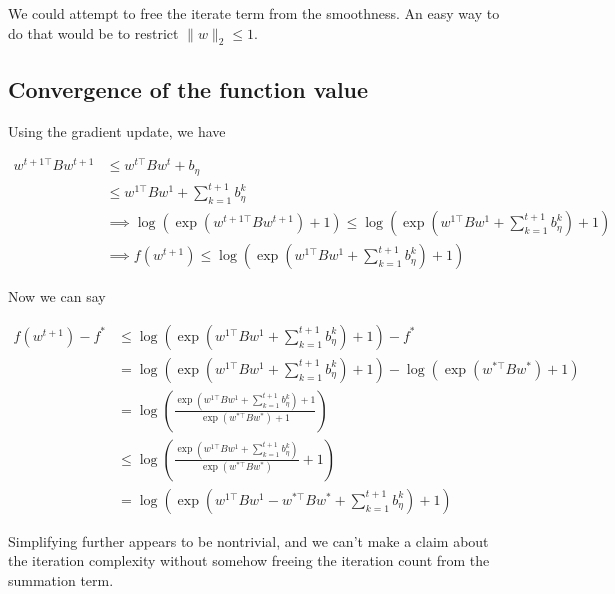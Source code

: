 \documentclass[11pt]{article}
\begin{document}
We could attempt to free the iterate term from the smoothness. An easy way to do that would be to restrict $\|w\|_2 \leq 1$.

\subsection{Convergence of the function value}

Using the gradient update, we have

\begin{align*}
    w^{t+1\top}Bw^{t+1} &\leq w^{t\top}Bw^{t} + b_\eta \\
    &\leq w^{1\top}Bw^{1} + \sum_{k=1}^{t+1} b_\eta^k \\
    &\implies \log( \exp(w^{t+1\top}Bw^{t+1}) + 1) \leq \log( \exp(w^{1\top}Bw^{1} + \sum_{k=1}^{t+1} b_\eta^k) + 1) \\
    &\implies f(w^{t+1}) \leq \log( \exp(w^{1\top}Bw^{1} + \sum_{k=1}^{t+1} b_\eta^k) + 1)
\end{align*}

Now we can say

\begin{align*}
    f(w^{t+1}) - f^* &\leq \log( \exp(w^{1\top}Bw^{1} + \sum_{k=1}^{t+1} b_\eta^k) + 1) - f^* \\
    &= \log( \exp(w^{1\top}Bw^{1} + \sum_{k=1}^{t+1} b_\eta^k) + 1) - \log( \exp(w^{*\top}Bw^{*}) + 1) \\
    &= \log \left( \frac{\exp(w^{1\top}Bw^{1} + \sum_{k=1}^{t+1} b_\eta^k) + 1}{\exp(w^{*\top}Bw^{*}) + 1} \right) \\
    &\leq \log \left( \frac{\exp(w^{1\top}Bw^{1} + \sum_{k=1}^{t+1} b_\eta^k)}{\exp(w^{*\top}Bw^{*})} + 1 \right) \\
    &= \log \left( \exp \left(w^{1\top}Bw^{1} - w^{*\top}Bw^{*} + \sum_{k=1}^{t+1} b_\eta^k \right) + 1 \right)
\end{align*}

Simplifying further appears to be nontrivial, and we can't make a claim about the iteration complexity without somehow freeing the iteration count from the summation term.


\end{document}
